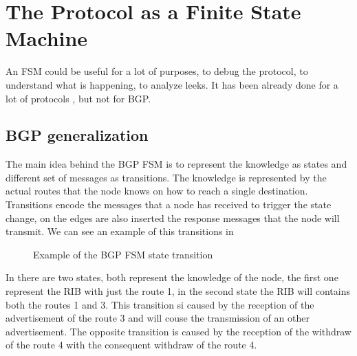 \chapter{The Protocol as a Finite State Machine}
\label{cha:bgp_fsm}

An \ac{FSM} could be useful for a lot of purposes, to debug the protocol, to 
understand what is happening, to analyze leeks.
It has been already done for a lot of protocols , but 
not for \ac{BGP}.


\section{BGP generalization}
\label{sec:bgp_generalization}

The main idea behind the \ac{BGP} \ac{FSM} is to represent the knowledge as
states and different set of messages as transitions.
The knowledge is represented by the actual routes that the node knows on how 
to reach a single destination.
Transitions encode the messages that a node has received to trigger the state change,
on the edges are also inserted the response messages that the node will transmit.
We can see an example of this transitions in 

\begin{figure}[h]                                                               
    \begin{center}                                                              
        
    \end{center}                                                                
	\caption{Example of the \ac{BGP} \ac{FSM} state transition}
    \label{fig:fsm_example}                                                   
\end{figure}

In  there are two states, both represent the knowledge of
the node, the first one represent the \ac{RIB} with just the route \num{1}, in
the second state the \ac{RIB} will contains both the routes \num{1} and \num{3}.
This transition si caused by the reception of the advertisement of the route 
\num{3} and will couse the transmission of an other advertisement.
The opposite transition is caused by the reception of the withdraw of the route
\num{4} with the consequent withdraw of the route \num{4}.

